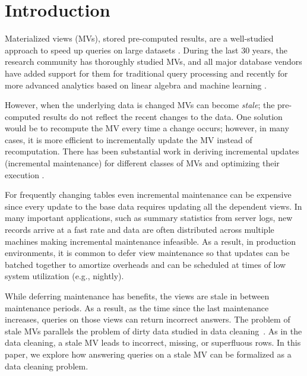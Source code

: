 \vspace{-0.5em}
\section{Introduction}
Materialized views (MVs), stored pre-computed results, are a well-studied approach to speed up queries on large datasets \cite{LarsonY85, gupta1995maintenance, chirkova2011materialized, halevy2001answering}.
During the last 30 years, the research community has thoroughly studied MVs, and all major database vendors have added support for them for traditional query processing and recently for more advanced analytics based on linear algebra and machine learning \cite{nikolic2014linview, zhang2014mat}.

However, when the underlying data is changed MVs can become \emph{stale}; the pre-computed results do not reflect the recent changes to the data. 
One solution would be to recompute the MV every time a change occurs; however, in many cases, it is more efficient to incrementally update the MV instead of recomputation.
There has been substantial work in deriving incremental updates (incremental maintenance) for different classes of MVs and optimizing their execution \cite{chirkova2011materialized}.

For frequently changing tables even incremental maintenance can be expensive since every update to the base data requires updating all the dependent views.  
In many important applications, such as summary statistics from server logs, new records arrive at a fast rate and data are often distributed across multiple machines making incremental maintenance infeasible. 
As a result, in production environments, it is common to defer view maintenance \cite{chirkova2011materialized, zhou2007lazy, DBLP:conf/sigmod/ColbyGLMT96} so that updates can be batched together to amortize overheads and can be scheduled at times of low system utilization (e.g., nightly).  

While deferring maintenance has benefits, the views are stale in between maintenance periods.
As a result, as the time since the last maintenance increases, queries on those views can return incorrect answers.
The problem of stale MVs parallels the problem of dirty data studied in data cleaning~\cite{rahm2000data}.
As in the data cleaning, a stale MV leads to incorrect, missing, or superfluous rows.
In this paper, we explore how answering queries on a stale MV can be formalized as a data cleaning problem. 

